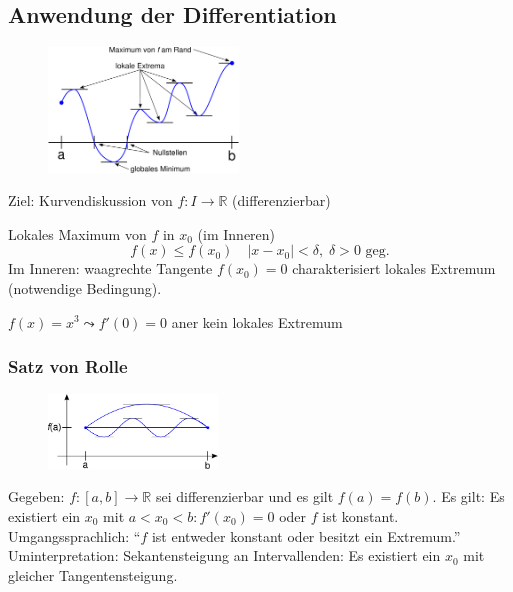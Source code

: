 \subsection{Anwendung der Differentiation}
\begin{figure}
 	\begin{center}
		\includegraphics[width=0.45\textwidth]{include/20091201-1.pdf}
	\end{center}
\end{figure}
Ziel: Kurvendiskussion von $f: I \rightarrow \mathbb{R}$ (differenzierbar)
\begin{definition}
	Lokales Maximum von $f$ in $x_0$ (im Inneren)
	\begin{equation*}
		f(x) \leq f(x_0) \quad |x - x_0| < \delta,\;\delta>0\text{ geg.}
	\end{equation*}
	Im Inneren: waagrechte Tangente $f(x_0) = 0$ charakterisiert lokales Extremum (notwendige Bedingung).
\end{definition}
\begin{note}
	$f(x) = x^3 \leadsto f'(0) = 0$ aner kein lokales Extremum
\end{note}

\subsubsection{Satz von Rolle}
\begin{figure}
 	\begin{center}
		\includegraphics[width=0.4\textwidth]{include/20091201-2.pdf}
	\end{center}
\end{figure}
Gegeben: $f:[a, b] \rightarrow \mathbb{R}$ sei differenzierbar und es gilt $f(a) = f(b)$.
Es gilt: Es existiert ein $x_0$ mit $a < x_0 < b : f'(x_0) = 0$ oder $f$ ist konstant. Umgangssprachlich: "`$f$ ist entweder konstant oder besitzt ein Extremum."'
Uminterpretation: Sekantensteigung an Intervallenden: Es existiert ein $x_0$ mit gleicher Tangentensteigung.

